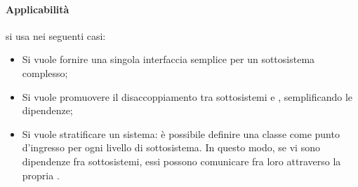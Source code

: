 \paragraph{Applicabilità}
\textit{} si usa nei seguenti casi:
\begin{itemize}
\item Si vuole fornire una singola interfaccia semplice per un sottosistema complesso;
\item Si vuole promuovere il disaccoppiamento tra sottosistemi e , semplificando le dipendenze;
\item Si vuole stratificare un sistema: è possibile definire una classe  come punto d'ingresso per ogni livello di sottosistema. In questo modo, se vi sono dipendenze fra sottosistemi, essi possono comunicare fra loro attraverso la propria .
\end{itemize}
